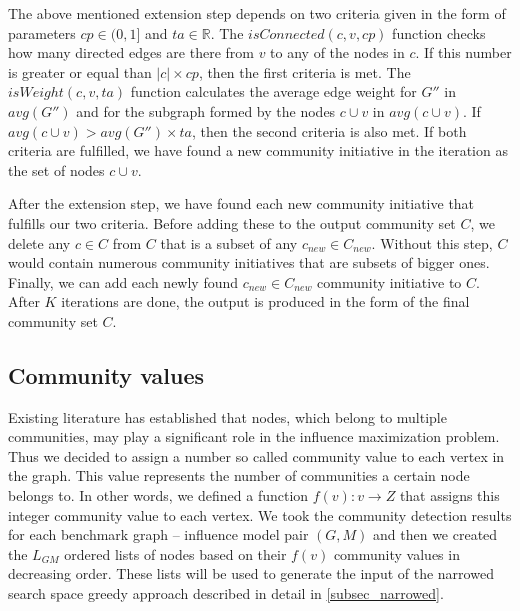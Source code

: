 \documentclass[pdflatex,sn-mathphys-ay]{sn-jnl}
\begin{document}
The above mentioned extension step depends on two criteria given in the form of parameters $cp \in (0,1]$ and $ta \in \mathbb{R}$. The $isConnected(c,v,cp)$ function checks how many directed edges are there from $v$ to any of the nodes in $c$. If this number is greater or equal than $|c| \times cp$, then the first criteria is met. The $isWeight(c,v,ta)$ function calculates the average edge weight for $G''$ in $avg(G'')$ and for the subgraph formed by the nodes $c \cup v$ in $avg(c \cup v)$. If $avg(c \cup v) > avg(G'') \times ta$, then the second criteria is also met. If both criteria are fulfilled, we have found a new community initiative in the iteration as the set of nodes $c \cup v$.

After the extension step, we have found each new community initiative that fulfills our two criteria. Before adding these to the output community set $C$, we delete any $c \in C$ from $C$ that is a subset of any $c_{new} \in C_{new}$. Without this step, $C$ would contain numerous community initiatives that are subsets of bigger ones. Finally, we can add each newly found $c_{new} \in C_{new}$ community initiative to $C$. After $K$ iterations are done, the output is produced in the form of the final community set $C$.


\subsection{Community values}\label{subsec_commval}

Existing literature \citep{cim} has established that nodes, which belong to multiple communities, may play a significant role in the influence maximization problem. Thus we decided to assign a number so called community value to each vertex in the graph. This value represents the number of communities a certain node belongs to. In other words, we defined a function $f(v): v \rightarrow Z$ that assigns this integer community value to each vertex. We took the community detection results for each benchmark graph -- influence model pair $(G,M)$ and then we created the $L_{GM}$ ordered lists of nodes based on their $f(v)$ community values in decreasing order. These lists will be used to generate the input of the narrowed search space greedy approach described in detail in \ref{subsec_narrowed}.

\end{document}
